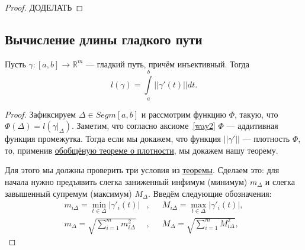 \begin{proof}
	ДОДЕЛАТЬ
\end{proof}

\subsection{Вычисление длины гладкого пути}

\begin{theorem}
	Пусть \(\gamma \colon [a, b] \to \mathbb{R}^m\) --- гладкий путь, причём инъективный. Тогда \[
		l(\gamma) = \int\limits_a^b ||\gamma'(t)|| dt.
	\]
\end{theorem}

\begin{proof}
	Зафиксируем \(\Delta \in Segm [a, b]\) и рассмотрим функцию \(\Phi\), такую, что \(\Phi(\Delta) = l(\gamma |_\Delta)\). Заметим, что согласно аксиоме~\ref{way2} \(\Phi\) --- аддитивная функция промежутка. Тогда если мы докажем, что функция \(||\gamma'||\) --- плотность \(\Phi\), то, применив \hyperlink{plotn}{обобщёную теореме о плотности}, мы докажем нашу теорему.
	
	Для этого мы должны проверить три условия из \hyperlink{plotn}{теоремы}. Сделаем это: для начала нужно предъявить слегка заниженный инфимум (минимум) \(m_\Delta\) и слегка завышенный супремум (максимум) \(M_\Delta\). Введём следующие обозначения:
	\begin{align*}
		m_{i\Delta} = \min\limits_{t \in \Delta} |\gamma'_i (t)|&, &&M_{i\Delta} = \max\limits_{t \in \Delta} |\gamma'_i (t)|, \\
		m_\Delta = \sqrt{\sum\limits_{i = 1}^m m_{i\Delta}^2}&, &&M_\Delta = \sqrt{\sum\limits_{i = 1}^m M_{i\Delta}^2},
	\end{align*}
	

\end{proof}
